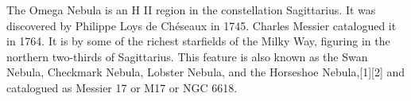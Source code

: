 The Omega Nebula is an H II region in the constellation Sagittarius. It was discovered by Philippe Loys de Chéseaux in 1745. Charles Messier catalogued it in 1764. It is by some of the richest starfields of the Milky Way, figuring in the northern two-thirds of Sagittarius. This feature is also known as the Swan Nebula, Checkmark Nebula, Lobster Nebula, and the Horseshoe Nebula,[1][2] and catalogued as Messier 17 or M17 or NGC 6618.
